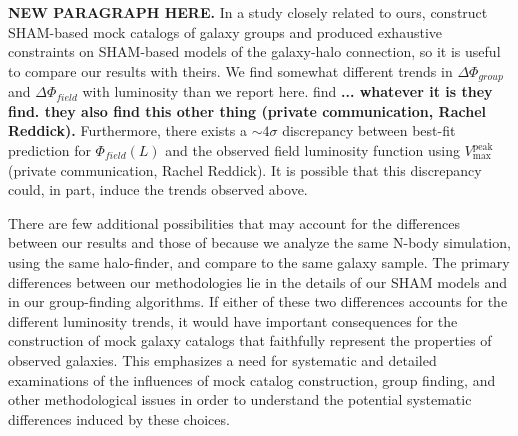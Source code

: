 \documentclass[usenatbib,usegraphicx,letterpaper]{mn2e}
\newcommand{\vpeak}{V_{\mathrm{max}}^{\mathrm{peak}}}
\begin{document}
{\bf NEW PARAGRAPH HERE.}
In a study closely related to ours, \citet{reddick_etal12}
construct SHAM-based mock catalogs of galaxy groups and produced exhaustive 
constraints on SHAM-based models of the galaxy-halo connection, so it 
is useful to compare our results with theirs.   
We find somewhat different trends in $\Delta\Phi_{group}$ and $\Delta\Phi_{field}$ 
with luminosity than we report here.  \citet{reddick_etal12} find 
{\bf ... whatever it is they find. they also find this other 
thing (private communication, Rachel Reddick).}  
Furthermore, there exists a $ \sim 4\sigma$ discrepancy
between \citet{reddick_etal12} best-fit prediction for $\Phi_{field}(L)$ and 
the observed field luminosity function using $\vpeak$ 
(private communication, Rachel Reddick). It is possible that 
this discrepancy could, in part, induce the trends observed above.


There are few additional possibilities that may account for the differences
between our results and those of \citet{reddick_etal12} because 
we analyze the same N-body simulation, using the same halo-finder, 
and compare to the same galaxy sample. The primary differences 
between our methodologies lie in the details of
our SHAM models and in our group-finding algorithms. If either of
these two differences accounts for the different luminosity trends, 
it would have important consequences for the construction of 
mock galaxy catalogs that faithfully represent the
properties of observed galaxies. This emphasizes a need for 
systematic and detailed examinations of the influences of 
mock catalog construction, group finding, and other methodological 
issues in order to understand the potential systematic differences 
induced by these choices.
\end{document}
